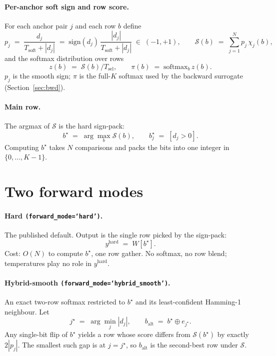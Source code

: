 \documentclass[11pt]{article}
\newcommand{\sign}{\mathrm{sign}}
\newcommand{\softmax}{\mathrm{softmax}}
\newcommand{\Tsel}{T_{\mathrm{sel}}}
\newcommand{\Tsoft}{T_{\mathrm{soft}}}
\newcommand{\bstar}{b^{\star}}
\newcommand{\jstar}{j^{\star}}
\begin{document}
\paragraph{Per-anchor soft sign and row score.}
For each anchor pair $j$ and each row $b$ define
\[
p_j \;=\; \frac{d_j}{\Tsoft + |d_j|} \;=\; \sign(d_j)\,\frac{|d_j|}{\Tsoft + |d_j|}\;\in\;(-1,+1),
\qquad
\mathcal{S}(b) \;=\; \sum_{j=1}^{N} p_j\, \chi_j(b),
\]
and the softmax distribution over rows
\[
z(b) \;=\; \mathcal{S}(b)/\Tsel,
\qquad \pi(b) \;=\; \softmax_b\,z(b).
\]
$p_j$ is the smooth sign; $\pi$ is the full-$K$ softmax used by the backward surrogate (Section~\ref{sec:bwd}).

\paragraph{Main row.} The argmax of $\mathcal{S}$ is the hard sign-pack:
\[
\bstar \;=\; \arg\max_{b} \mathcal{S}(b), \qquad \bstar_j \;=\; [d_j > 0].
\]
Computing $\bstar$ takes $N$ comparisons and packs the bits into one integer in $\{0,\dots,K-1\}$.

\section{Two forward modes}

\paragraph{Hard \texttt{(forward\_mode=`hard')}.} The published default. Output is the single row picked by the sign-pack:
\[
\boxed{\;
y^{\text{hard}} \;=\; W[\bstar].
\;}
\]
Cost: $O(N)$ to compute $\bstar$, one row gather. No softmax, no row blend; temperatures play no role in $y^{\text{hard}}$.

\paragraph{Hybrid-smooth \texttt{(forward\_mode=`hybrid\_smooth')}.} An exact two-row softmax restricted to $\bstar$ and its least-confident Hamming-1 neighbour. Let
\[
\jstar \;=\; \arg\min_{j} |d_j|, \qquad b_{\text{alt}} \;=\; \bstar \oplus e_{\jstar}.
\]
Any single-bit flip of $\bstar$ yields a row whose score differs from $\mathcal{S}(\bstar)$ by exactly $2|p_j|$. The smallest such gap is at $j = \jstar$, so $b_{\text{alt}}$ is the second-best row under $\mathcal{S}$.
\end{document}
